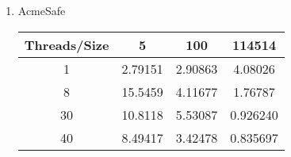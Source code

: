 \begin{enumerate}
\begin{enumerate}
    \item 
    AcmeSafe 
    \begin{center}
      \begin{tabular}{|c|c|c|c|}
      \hline
        Threads/Size & 5 & 100 & 114514 \\
      \hline 1 & 2.79151 & 2.90863 & 4.08026 \\
      \hline 8 & 15.5459 & 4.11677 & 1.76787 \\
      \hline 30 & 10.8118 & 5.53087 & 0.926240 \\
      \hline 40 & 8.49417 & 3.42478 & 0.835697 \\
      \hline
      \end{tabular}
    \end{center}
  \end{enumerate}


\end{enumerate}

